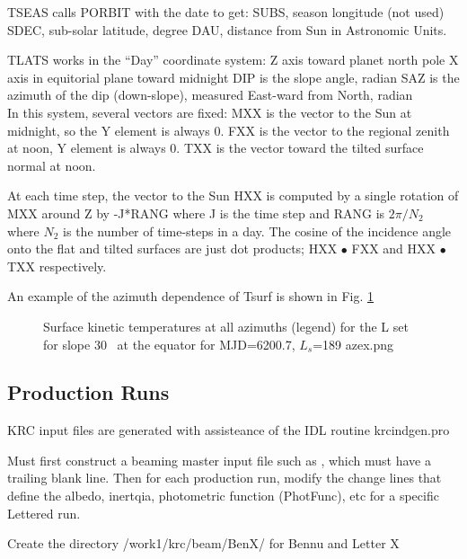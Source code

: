 \documentclass{article}
\begin{document}
TSEAS calls PORBIT with the date to get:
\qi SUBS, season longitude (not used)
\qi SDEC, sub-solar latitude, degree
\qi DAU, distance from Sun in Astronomic Units. 

TLATS works in the ``Day'' coordinate system: 
\qii Z axis toward planet north pole
\qii  X axis in equitorial plane toward midnight 
\qi DIP is the slope angle, radian
\qi SAZ is the azimuth of the dip (down-slope), measured East-ward from North, radian
\\ In this system, several vectors are fixed:
\qi MXX is the vector to the Sun at midnight, so the Y element is always 0.
\qi FXX is the vector to the regional zenith at noon,  Y element is always 0.
\qi TXX is the vector toward the tilted surface normal at noon.

At each time step, the vector to the Sun HXX is computed by a single rotation of
MXX around Z by -J*RANG where J is the time step and RANG is $2 \pi / N_2$ where
$N_2$ is the number of time-steps in a day. The cosine of the incidence angle
onto the flat and tilted surfaces are just dot products; HXX $\bullet$ FXX and 
 HXX $\bullet$ TXX respectively. 

An example of the azimuth dependence of Tsurf is shown in Fig. 
\ref{azex}
\begin{figure}[!ht] 
\caption[Example of azimuth set]{Surface kinetic temperatures at all azimuths (legend) for the L set for slope 30\qd~ at the equator for MJD=6200.7, $L_s$=189 
\label{azex}  azex.png  }
\end{figure} 

\subsection{Production Runs}  %
KRC input files are generated with assisteance of the IDL routine  krcindgen.pro

Must first construct a beaming master input file such as , which must
have a trailing blank line. Then for each production run, modify the change
lines that define the albedo, inertqia, photometric function (PhotFunc), etc for
a specific Lettered run.

Create the directory   /work1/krc/beam/BenX/ for Bennu and Letter X
\end{document}
